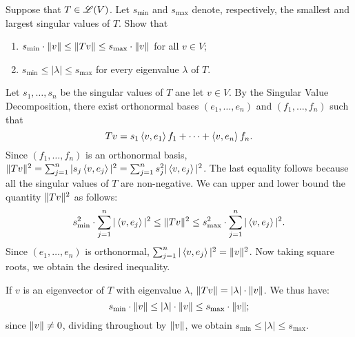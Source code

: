 \begin{exercise}
Suppose that $T \in \mathscr{L}(V)$. Let $s_{\min}$ and $s_{\max}$ denote, respectively,
the smallest and largest singular values of $T$. Show that
\begin{enumerate}
    \item $s_{\min} \cdot \lVert v\rVert \leq \lVert T v\rVert \leq s_{\max} \cdot \lVert v\rVert$
        for all $v \in V$;
    \item $s_{\min} \leq |\lambda| \leq s_{\max}$ for every eigenvalue $\lambda$ of
        $T$.
\end{enumerate}
\end{exercise}
\begin{solution}
Let $s_1, \ldots, s_n$ be the singular values of $T$ ane let $v \in V$. By the
Singular Value Decomposition, there exist orthonormal bases $(e_1, \ldots, e_n)$
and $(f_1, \ldots, f_n)$ such that
\[
    T v = s_1 \left \langle v, e_1 \right \rangle f_1 + \cdots + \left \langle v, e_n \right \rangle f_n.
\]
Since $(f_1, \ldots, f_n)$ is an orthonormal basis,
$\lVert T v\rVert^2 = \sum_{j = 1}^{n} | s_j \left \langle v, e_j \right \rangle|^2 =
\sum_{j = 1}^{n} s_j^2 |\left \langle v, e_j \right \rangle|^2$. The last equality follows because
all the singular values of $T$ are non-negative. We can upper and lower
bound the quantity $\lVert T v\rVert^2$ as follows:
\[
    s_{\min}^2  \cdot \sum_{j = 1}^{n} |\left \langle v, e_j \right \rangle|^2 \leq \lVert T v\rVert^2
    \leq  s_{\max}^2  \cdot \sum_{j = 1}^{n} |\left \langle v, e_j \right \rangle|^2.
\]
Since $(e_1, \ldots, e_n)$ is orthonormal,
$\sum_{j = 1}^{n} |\left \langle v, e_j \right \rangle|^2 = \lVert v\rVert^2$. Now taking square roots, we
obtain the desired inequality.

If $v$ is an eigenvector of $T$ with eigenvalue $\lambda$,
$\lVert T v\rVert = |\lambda | \cdot \lVert v\rVert$. We thus have:
\[
    s_{\min} \cdot \lVert v\rVert \leq |\lambda | \cdot \lVert v\rVert
                            \leq s_{\max} \cdot \lVert v\rVert;
\]
since $\lVert v\rVert \neq 0$, dividing throughout by $\lVert v\rVert$, we obtain
$s_{\min} \leq |\lambda| \leq s_{\max}$.
\end{solution}
